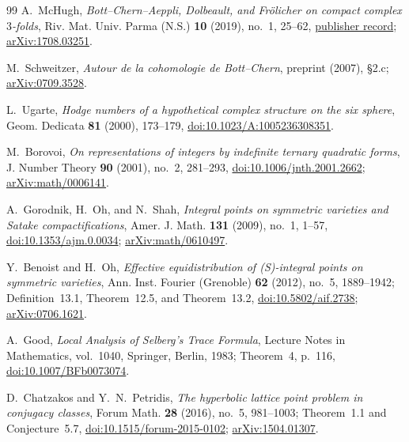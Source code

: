 \begin{thebibliography}{99}
A.~McHugh,
\emph{Bott--Chern--Aeppli, Dolbeault, and Fr\"olicher on compact complex
$3$-folds},
Riv. Mat. Univ. Parma (N.S.) \textbf{10} (2019), no.~1, 25--62,
\href{https://www.rivmat.unipr.it/vols/2019-10-1/02-mchugh.html}%
{publisher record};
\href{https://arxiv.org/abs/1708.03251}{arXiv:1708.03251}.

M.~Schweitzer,
\emph{Autour de la cohomologie de Bott--Chern},
preprint (2007), \S2.c;
\href{https://arxiv.org/abs/0709.3528}{arXiv:0709.3528}.

L.~Ugarte,
\emph{Hodge numbers of a hypothetical complex structure on the six sphere},
Geom. Dedicata \textbf{81} (2000), 173--179,
\href{https://doi.org/10.1023/A:1005236308351}%
{doi:10.1023/A:1005236308351}.

M.~Borovoi,
\emph{On representations of integers by indefinite ternary quadratic forms},
J. Number Theory \textbf{90} (2001), no.~2, 281--293,
\href{https://doi.org/10.1006/jnth.2001.2662}%
{doi:10.1006/jnth.2001.2662};
\href{https://arxiv.org/abs/math/0006141}{arXiv:math/0006141}.

A.~Gorodnik, H.~Oh, and N.~Shah,
\emph{Integral points on symmetric varieties and Satake compactifications},
Amer. J. Math. \textbf{131} (2009), no.~1, 1--57,
\href{https://doi.org/10.1353/ajm.0.0034}{doi:10.1353/ajm.0.0034};
\href{https://arxiv.org/abs/math/0610497}{arXiv:math/0610497}.

Y.~Benoist and H.~Oh,
\emph{Effective equidistribution of (S)-integral points on symmetric
varieties},
Ann. Inst. Fourier (Grenoble) \textbf{62} (2012), no.~5, 1889--1942;
Definition~13.1, Theorem~12.5, and Theorem~13.2,
\href{https://doi.org/10.5802/aif.2738}{doi:10.5802/aif.2738};
\href{https://arxiv.org/abs/0706.1621}{arXiv:0706.1621}.

A.~Good,
\emph{Local Analysis of Selberg's Trace Formula},
Lecture Notes in Mathematics, vol.~1040, Springer, Berlin, 1983;
Theorem~4, p.~116,
\href{https://doi.org/10.1007/BFb0073074}{doi:10.1007/BFb0073074}.

D.~Chatzakos and Y.~N.~Petridis,
\emph{The hyperbolic lattice point problem in conjugacy classes},
Forum Math. \textbf{28} (2016), no.~5, 981--1003;
Theorem~1.1 and Conjecture~5.7,
\href{https://doi.org/10.1515/forum-2015-0102}%
{doi:10.1515/forum-2015-0102};
\href{https://arxiv.org/abs/1504.01307}{arXiv:1504.01307}.


\end{thebibliography}
